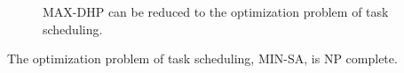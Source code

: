 \documentclass[prodmode,acmtosn]{acmsmall}
\begin{document}
\begin{figure}[t]
\centering
{}
\caption{MAX-DHP can be reduced to the optimization problem of  task scheduling.}
\label{figure_proof_scheduling}
\end{figure}




\begin{lemma}
\label{lemma_scheduling}
The optimization problem of task scheduling, MIN-SA, is NP complete.
\end{lemma}
\end{document}
